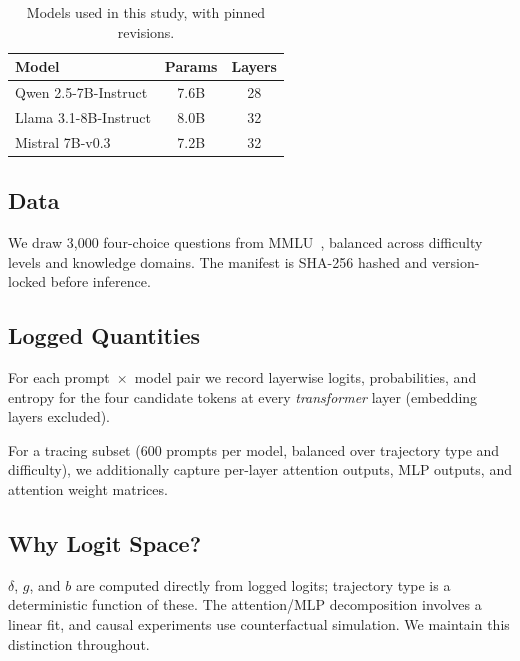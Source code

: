 \documentclass{article}
\begin{document}
\begin{table}[!htbp]
  \caption{Models used in this study, with pinned revisions.}
  \label{tab:models}
  \vskip 0.1in
  \begin{center}
  \begin{small}
  \begin{sc}
  \begin{tabular}{lcc}
    \toprule
    Model & Params & Layers \\
    \midrule
    Qwen 2.5-7B-Instruct  & 7.6B & 28 \\
    Llama 3.1-8B-Instruct  & 8.0B & 32 \\
    Mistral 7B-v0.3 & 7.2B & 32 \\
    \bottomrule
  \end{tabular}
  \end{sc}
  \end{small}
  \end{center}
  \vskip -0.1in
\end{table}

\subsection{Data}

We draw 3{,}000 four-choice questions from MMLU~\cite{hendrycks2021}, balanced across difficulty levels and knowledge domains.  The manifest is SHA-256 hashed and version-locked before inference.

\subsection{Logged Quantities}

For each prompt~$\times$~model pair we record layerwise logits, probabilities, and entropy for the four candidate tokens at every \emph{transformer} layer (embedding layers excluded).

For a tracing subset (600 prompts per model, balanced over trajectory type and difficulty), we additionally capture per-layer attention outputs, MLP outputs, and attention weight matrices.

\subsection{Why Logit Space?}

$\delta$, $g$, and $b$ are computed directly from logged logits; trajectory type is a deterministic function of these.  The attention/MLP decomposition involves a linear fit, and causal experiments use counterfactual simulation.  We maintain this distinction throughout.
\end{document}
